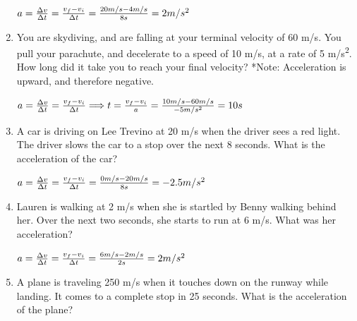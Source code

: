 \documentclass[letterpaper, 12pt]{article}
\begin{document}
\begin{enumerate}
	
	
	\color{red}
	\begin{center} $ a = \frac{\Delta v}{\Delta t } = \frac{v_f - v_i}{\Delta t} =  \frac{20 m/s - 4 m/s}{8s} = 2 m/s^2
		\vspace{0.15in} $
	\end{center}	
	\color{black}
	

\item You are skydiving, and are falling at your terminal velocity of 60 m/s.  You pull your parachute, and decelerate to a speed of 10 m/s, at a rate of 5 m/s\textsuperscript{2}.  How long did it take you to reach your final velocity? \color{red} *Note: Acceleration is upward, and therefore negative.



\begin{center} $ a = \frac{\Delta v}{\Delta t } = \frac{v_f - v_i}{\Delta t} \Longrightarrow t = \frac{v_f-v_i}{a} = \frac{10m/s-60m/s}{-5m/s^2} = 10s
	\vspace{0.15in} $
\end{center}	
\color{black}



\item A car is driving on Lee Trevino at 20 m/s when the driver sees a red light.  The driver slows the car to a stop over the next 8 seconds.  What is the acceleration of the car?

		\vspace{0.15in}
		\color{red}
	\begin{center} $ a = \frac{\Delta v}{\Delta t } = \frac{v_f - v_i}{\Delta t} = \frac{0m/s-20m/s}{8s} = -2.5 m/s^2
		\vspace{0.95in} $
	\end{center}
	\color{black}



\item Lauren is walking at 2 m/s when she is startled by Benny walking behind her. Over the next two seconds, she starts to run at 6 m/s. What was her acceleration?
	
	\color{red}
	\begin{center} $ a = \frac{\Delta v}{\Delta t } = \frac{v_f - v_i}{\Delta t} = \frac{6m/s-2m/s}{2s} = 2 m/s^2
		\vspace{0.15in} $
	\end{center}
	\color{black}

\item A plane is traveling 250 m/s when it touches down on the runway while landing.  It comes to a complete stop in 25 seconds.  What is the acceleration of the plane?


\end{enumerate}
\end{document}
